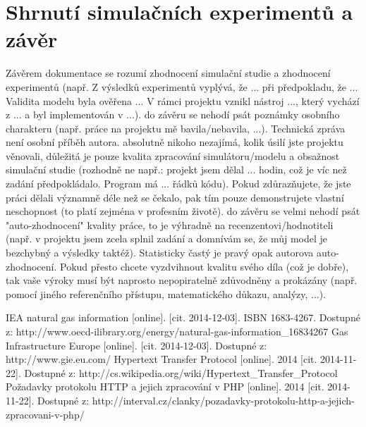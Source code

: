 \documentclass[a4paper,11pt]{article}
\begin{document}
\section{Shrnutí simulačních experimentů a závěr}

Závěrem dokumentace se rozumí zhodnocení simulační studie a zhodnocení experimentů (např. Z výsledků experimentů vyplývá, že ... při předpokladu, že ... Validita modelu byla ověřena ... V rámci projektu vznikl nástroj ..., který vychází z ... a byl implementován v ...).
do závěru se nehodí psát poznámky osobního charakteru (např. práce na projektu mě bavila/nebavila, ...). Technická zpráva není osobní příběh autora.
absolutně nikoho nezajímá, kolik úsilí jste projektu věnovali, důležitá je pouze kvalita zpracování simulátoru/modelu a obsažnost simulační studie (rozhodně ne např.: projekt jsem dělal ... hodin, což je víc než zadání předpokládalo. Program má ... řádků kódu). Pokud zdůrazňujete, že jste práci dělali významně déle než se čekalo, pak tím pouze demonstrujete vlastní neschopnost (to platí zejména v profesním životě).
do závěru se velmi nehodí psát "auto-zhodnocení" kvality práce, to je výhradně na recenzentovi/hodnotiteli (např. v projektu jsem zcela splnil zadání a domnívám se, že můj model je bezchybný a výsledky taktéž). Statisticky častý je pravý opak autorova auto-zhodnocení. Pokud přesto chcete vyzdvihnout kvalitu svého díla (což je dobře), tak vaše výroky musí být naprosto nepopiratelně zdůvodněny a prokázány (např. pomocí jiného referenčního přístupu, matematického důkazu, analýzy, ...).


\newpage
\renewcommand{\refname}{Literatura}
\begin{thebibliography}{99}
 IEA natural gas information [online]. [cit. 2014-12-03]. ISBN 1683-4267. Dostupné z: http://www.oecd-ilibrary.org/energy/natural-gas-information{\_}16834267
 Gas Infrastructure Europe [online]. [cit. 2014-12-03]. Dostupné z: http://www.gie.eu.com/
 Hypertext Transfer Protocol [online]. 2014 [cit. 2014-11-22].
Dostupné z: http://cs.wikipedia.org/wiki/Hypertext{\_}Transfer{\_}Protocol
 Požadavky protokolu HTTP a jejich zpracování v PHP [online]. 2014 [cit. 2014-11-22].
Dostupné z: http://interval.cz/clanky/pozadavky-protokolu-http-a-jejich-zpracovani-v-php/
\end{thebibliography}
\end{document}
